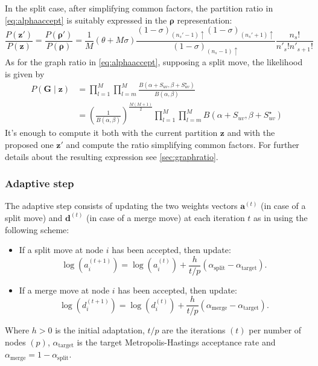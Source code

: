 In the split case, after simplifying common factors, the partition ratio in \eqref{eq:alphaaccept} is suitably expressed in the $\bm{\rho}$ representation:
\begin{equation*}
    \frac{P(\bm{z}')}{P(\bm{z})}
    =
    \frac{P(\bm{\rho}')}{P(\bm{\rho})}
    =
    \frac{1}{M}(\theta+M\sigma)\frac{(1-\sigma)_{(n_{s}'-1)\uparrow}(1-\sigma)_{(n_{s}'+1)\uparrow}}{(1-\sigma)_{(n_{s}-1)\uparrow}}\frac{n_{s}!}{n'_{s}!n'_{s+1}!}
\end{equation*}
As for the graph ratio in \eqref{eq:alphaaccept}, supposing a split move, the likelihood is given by
\begin{align*}
    P(\bm{G}\mid \bm{z}) &= \prod_{l=1}^M \prod_{l=m}^M \frac{B(\alpha+S_{uv},\beta+S^{\star}_{uv})}{B(\alpha,\beta)} \\
    &= \left(\frac{1}{B(\alpha,\beta)}\right)^\frac{M(M+1)}{2}\prod_{l=1}^M \prod_{l=m}^M B(\alpha+S_{uv},\beta+S^{\star}_{uv})
\end{align*}
It's enough to compute it both with the current partition $\bm{z}$ and with the proposed one $\bm{z}'$ and compute the ratio simplifying common factors. For further details about the resulting expression see \ref{sec:graphratio}.

\subsubsection{Adaptive step}

The adaptive step consists of updating the two weights vectors $\bm{a}^{(t)}$ (in case of a split move) and $\bm{d}^{(t)}$ (in case of a merge move) at each iteration $t$ as in \textcite{bensonAdaptiveMCMCMultiple2018} using the following scheme:
    \begin{itemize}
        \item If a split move at node $i$ has been accepted, then update:
        \[
            \log (a_i^{(t+1)})=\log (a_i^{(t)})+\frac{h}{t/p}(\alpha_{\text{split}}-\alpha_{\text{target}}) .
        \]
        \item If a merge move at node $i$ has been accepted, then update:
        \[
            \log (d_i^{(t+1)})=\log (d_i^{(t)})+\frac{h}{t/p}(\alpha_{\text{merge}}-\alpha_{\text{target}}) .
        \]
    \end{itemize}

Where $h>0$ is the initial adaptation, $t/p$ are the iterations $(t)$ per number of nodes $(p)$, $\alpha_{\text{target}}$ is the target Metropolis-Hastings acceptance rate and $\alpha_{\text{merge}} = 1 - \alpha_{\text{split}}$.


